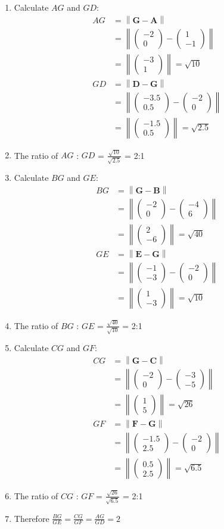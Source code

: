 \documentclass[journal,12pt,twocolumn]{IEEEtran}
\theoremstyle{remark}
\newcommand{\norm}[1]{\left\lVert#1\right\rVert}
\newcommand{\myvec}[1]{\begin{pmatrix}#1\end{pmatrix}}
\let\vec\mathbf
\begin{document}
\begin{enumerate}
\item Calculate $AG$ and $GD$:
\begin{align}
AG &= \norm{\vec{G} - \vec{A}} \\
&= \norm{\myvec{-2 \\ 0} - \myvec{1 \\ -1}} \\
&= \norm{\myvec{-3 \\ 1}} = \sqrt{10} \\
GD &= \norm{\vec{D} - \vec{G}} \\
&= \norm{\myvec{-3.5 \\ 0.5} - \myvec{-2 \\ 0}} \\
&= \norm{\myvec{-1.5 \\ 0.5}} = \sqrt{2.5}
\end{align}
\item The ratio of $AG$ : $GD$ = $\frac{\sqrt{10}}{\sqrt{2.5}}$ = 2:1\\ 
\item Calculate $BG$ and $GE$:
\begin{align}
BG &= \norm{\vec{G} - \vec{B}} \\
&= \norm{\myvec{-2 \\ 0} - \myvec{-4 \\ 6}} \\
&= \norm{\myvec{2 \\ -6}} = \sqrt{40} \\
GE &= \norm{\vec{E} - \vec{G}} \\
&= \norm{\myvec{-1 \\ -3} - \myvec{-2 \\ 0}} \\
&= \norm{\myvec{1 \\ -3}} = \sqrt{10}
\end{align}
\item The ratio of $BG$ : $GE$ = $\frac{\sqrt{40}}{\sqrt{10}}$ = 2:1\\
\item Calculate $CG$ and $GF$: 
\begin{align}
CG &= \norm{\vec{G} - \vec{C}} \\
&= \norm{\myvec{-2 \\ 0} - \myvec{-3 \\ -5}} \\
&= \norm{\myvec{1 \\ 5}} = \sqrt{26} \\
GF &= \norm{\vec{F} - \vec{G}} \\
&= \norm{\myvec{-1.5 \\ 2.5} - \myvec{-2 \\ 0}} \\
&= \norm{\myvec{0.5 \\ 2.5}} = \sqrt{6.5}
\end{align}
\item The ratio of $CG$ : $GF$ = $\frac{\sqrt{26}}{\sqrt{6.5}}$ = 2:1\\
\item Therefore $\frac{BG}{GE}=\frac{CG}{GF}=\frac{AG}{GD}=2$
\end{enumerate}
\end{document}
